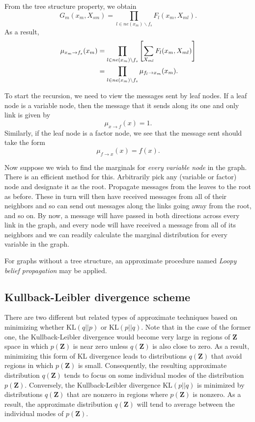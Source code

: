 \documentclass[a4paper]{book}
\newcommand{\up}{\mathrm}
\renewcommand{\bf}{\mathbf}
\newcommand{\imp}[1]{\textit{#1}}
\begin{document}
From the tree structure property, we obtain
\begin{equation}
	G_m(x_m, X_{sm}) = \prod_{l \in ne(x_m)\backslash f_s} F_l(x_m,X_{ml}).
\end{equation}
As a result,
\begin{align}
	\mu_{x_m \rightarrow f_s} (x_m) &= \prod_{l \in ne(x_m)\backslash f_s}\left[ \sum_{X_{ml}} F_l(x_m,X_{ml}) \right]\notag \\
	&= \prod_{l \in ne(x_m) \backslash f_s} \mu_{f_l \rightarrow x_m}(x_m).
\end{align}

To start the recursion, we need to view the messages sent by leaf nodes. If a leaf node is a variable node, then the message that it sends along its one and only link is given by
\begin{equation}
	\mu_{x \rightarrow f}(x) = 1.
\end{equation} 
Similarly, if the leaf node is a factor node, we see that the message sent should take the form
\begin{equation}
	\mu_{f \rightarrow x}(x) = f(x).
\end{equation}

Now suppose we wish to find the marginals for \imp{every variable node} in the graph. There is an efficient method for this. Arbitrarily pick any (variable or factor) node and designate it as the root. Propagate messages from the leaves to the root as before. These in turn will then have received messages from all of their neighbors and so can send out messages along the links going away from the root, and so on. By now, a message will have passed in both directions across every link in the graph, and every node will have received a message from all of its neighbors and we can readily calculate the marginal distribution for every variable in the graph.

For graphs without a tree structure, an approximate procedure named \imp{Loopy belief propagation} may be applied.
\subsection{Kullback-Leibler divergence scheme}
There are two different but related types of approximate techniques based on minimizing whether $\up{KL}(q||p)$ or $\up{KL}(p||q)$. Note that in the case of the former one, the Kullback-Leibler divergence would become very large in regions of $\bf{Z}$ space in which $p(\bf{Z})$ is near zero unless $q(\bf{Z})$ is also close to zero. As a result, minimizing this form of KL divergence leads to distributions $q(\bf{Z})$ that avoid regions in which $p(\bf{Z})$ is small. Consequently, the resulting approximate distribution $q(\bf{Z})$ tends to focus on some individual modes of the distribution $p(\bf{Z})$. Conversely, the Kullback-Leibler divergence $\up{KL}(p||q)$ is minimized by distributions $q(\bf{Z})$ that are nonzero in regions where $p(\bf{Z})$ is nonzero. As a result, the approximate distribution $q(\bf{Z})$ will tend to average between the individual modes of $p(\bf{Z})$.
\end{document}
